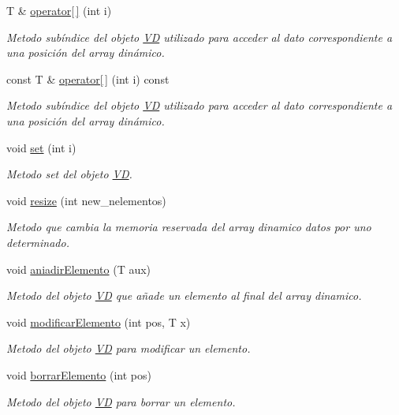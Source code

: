 \begin{DoxyCompactItemize}
T \& \hyperlink{classVD_a7d80240b5791d62b7e27657763afe712}{operator\mbox{[}$\,$\mbox{]}} (int i)
\begin{DoxyCompactList}\small\item\em Metodo subíndice del objeto \hyperlink{classVD}{VD} utilizado para acceder al dato correspondiente a una posición del array dinámico. \end{DoxyCompactList}\item 
const T \& \hyperlink{classVD_a16ae24a4b545a02baf6733ba5c066346}{operator\mbox{[}$\,$\mbox{]}} (int i) const
\begin{DoxyCompactList}\small\item\em Metodo subíndice del objeto \hyperlink{classVD}{VD} utilizado para acceder al dato correspondiente a una posición del array dinámico. \end{DoxyCompactList}\item 
void \hyperlink{classVD_ac6aea049465bd63188c8e66df39c6dd5}{set} (int i)
\begin{DoxyCompactList}\small\item\em Metodo set del objeto \hyperlink{classVD}{VD}. \end{DoxyCompactList}\item 
void \hyperlink{classVD_a473e1573994209fa70e955bc73b0e8c4}{resize} (int new\+\_\+nelementos)
\begin{DoxyCompactList}\small\item\em Metodo que cambia la memoria reservada del array dinamico datos por uno determinado. \end{DoxyCompactList}\item 
void \hyperlink{classVD_a4a3d631ec9c48db64746377745141fef}{aniadir\+Elemento} (T aux)
\begin{DoxyCompactList}\small\item\em Metodo del objeto \hyperlink{classVD}{VD} que añade un elemento al final del array dinamico. \end{DoxyCompactList}\item 
void \hyperlink{classVD_a771eef0cc3fc7671dce4666dd17474a6}{modificar\+Elemento} (int pos, T x)
\begin{DoxyCompactList}\small\item\em Metodo del objeto \hyperlink{classVD}{VD} para modificar un elemento. \end{DoxyCompactList}\item 
void \hyperlink{classVD_a1ada7fe4356a885e7b90e396bbd6af24}{borrar\+Elemento} (int pos)
\begin{DoxyCompactList}\small\item\em Metodo del objeto \hyperlink{classVD}{VD} para borrar un elemento. \end{DoxyCompactList}\item 

\end{DoxyCompactItemize}
